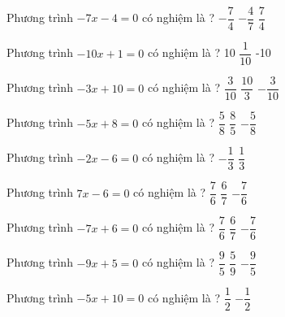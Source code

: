 \begin{ex} 
 Phương trình $-7x-4=0$ có nghiệm là ? 
 {$- \dfrac{ 7 }{ 4 } $} 
 {\True $- \dfrac{ 4 }{ 7 } $} 
 {$ \dfrac{ 7 }{ 4 } $}  
 \loigiai{} 
 \end{ex} 
 
\begin{ex} 
 Phương trình $-10x+1=0$ có nghiệm là ? 
 {10} 
 {\True $ \dfrac{ 1 }{ 10 } $} 
 {-10}  
 \loigiai{} 
 \end{ex} 
 
\begin{ex} 
 Phương trình $-3x+10=0$ có nghiệm là ? 
 {$ \dfrac{ 3 }{ 10 } $} 
 {\True $ \dfrac{ 10 }{ 3 } $} 
 {$- \dfrac{ 3 }{ 10 } $}  
 \loigiai{} 
 \end{ex} 
 
\begin{ex} 
 Phương trình $-5x+8=0$ có nghiệm là ? 
 {$ \dfrac{ 5 }{ 8 } $} 
 {\True $ \dfrac{ 8 }{ 5 } $} 
 {$- \dfrac{ 5 }{ 8 } $}  
 \loigiai{} 
 \end{ex} 
 
\begin{ex} 
 Phương trình $-2x-6=0$ có nghiệm là ? 
 {$- \dfrac{ 1 }{ 3 } $} 
 {} 
 {$ \dfrac{ 1 }{ 3 } $}  
 \loigiai{} 
 \end{ex} 
 
\begin{ex} 
 Phương trình $7x-6=0$ có nghiệm là ? 
 {$ \dfrac{ 7 }{ 6 } $} 
 {\True $ \dfrac{ 6 }{ 7 } $} 
 {$- \dfrac{ 7 }{ 6 } $}  
 \loigiai{} 
 \end{ex} 
 
\begin{ex} 
 Phương trình $-7x+6=0$ có nghiệm là ? 
 {$ \dfrac{ 7 }{ 6 } $} 
 {\True $ \dfrac{ 6 }{ 7 } $} 
 {$- \dfrac{ 7 }{ 6 } $}  
 \loigiai{} 
 \end{ex} 
 
\begin{ex} 
 Phương trình $-9x+5=0$ có nghiệm là ? 
 {$ \dfrac{ 9 }{ 5 } $} 
 {\True $ \dfrac{ 5 }{ 9 } $} 
 {$- \dfrac{ 9 }{ 5 } $}  
 \loigiai{} 
 \end{ex} 
 
\begin{ex} 
 Phương trình $-5x+10=0$ có nghiệm là ? 
 {$ \dfrac{ 1 }{ 2 } $} 
 {} 
 {$- \dfrac{ 1 }{ 2 } $}  
 \loigiai{} 
 \end{ex} 
 
